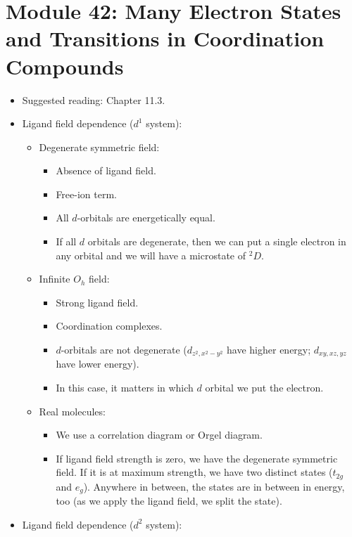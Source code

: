 \documentclass[../notes.tex]{subfiles}
\begin{document}
\section{Module 42: Many Electron States and Transitions in Coordination Compounds}
\begin{itemize}
    \item Suggested reading: Chapter 11.3.
    \item Ligand field dependence ($d^1$ system):
    \begin{itemize}
        \item Degenerate symmetric field:
        \begin{itemize}
            \item Absence of ligand field.
            \item Free-ion term.
            \item All $d$-orbitals are energetically equal.
            \item If all $d$ orbitals are degenerate, then we can put a single electron in any orbital and we will have a microstate of ${}^2D$.
        \end{itemize}
        \item Infinite $O_h$ field:
        \begin{itemize}
            \item Strong ligand field.
            \item Coordination complexes.
            \item $d$-orbitals are not degenerate ($d_{z^2,x^2-y^2}$ have higher energy; $d_{xy,xz,yz}$ have lower energy).
            \item In this case, it matters in which $d$ orbital we put the electron.
        \end{itemize}
        \item Real molecules:
        \begin{itemize}
            \item We use a correlation diagram or Orgel diagram.
            \item If ligand field strength is zero, we have the degenerate symmetric field. If it is at maximum strength, we have two distinct states ($t_{2g}$ and $e_g$). Anywhere in between, the states are in between in energy, too (as we apply the ligand field, we split the state).
        \end{itemize}
    \end{itemize}
    \item Ligand field dependence ($d^2$ system):

\end{itemize}
\end{document}
